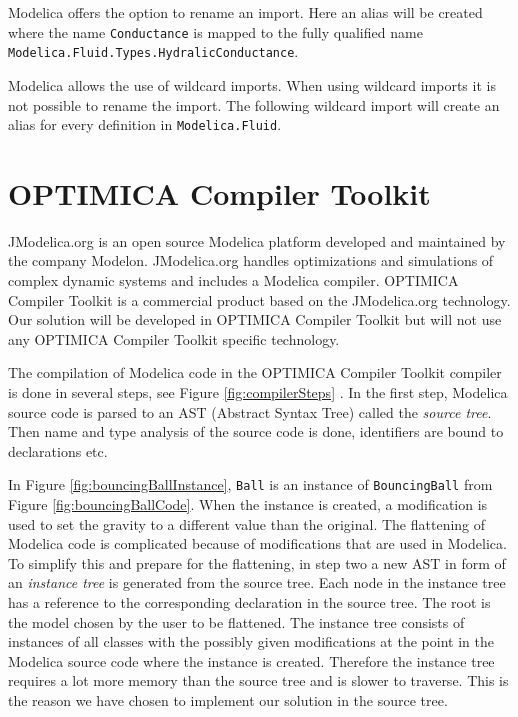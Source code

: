 \documentclass{cslthse-msc}
\begin{document}


Modelica offers the option to rename an import. Here an alias will be created where the name \texttt{Conductance} is mapped to the fully qualified name \\\texttt{Modelica.Fluid.Types.HydralicConductance}.



Modelica allows the use of wildcard imports. When using wildcard imports it is not possible to rename the import. The following wildcard import will create an alias for every definition in \texttt{Modelica.Fluid}.



\section{OPTIMICA Compiler Toolkit}
JModelica.org is an open source Modelica platform developed and maintained by the company Modelon. JModelica.org handles optimizations and simulations of complex dynamic systems and includes a Modelica compiler. OPTIMICA Compiler Toolkit  is a commercial product based on the JModelica.org technology. Our solution will be developed in OPTIMICA Compiler Toolkit  but will not use any OPTIMICA Compiler Toolkit  specific technology. 

The compilation of Modelica code in the OPTIMICA Compiler Toolkit  compiler is done in several steps, see Figure \ref{fig:compilerSteps} \cite{aakesson2010implementation}. In the first step, Modelica source code is parsed to an AST (Abstract Syntax Tree) called the \emph{source tree}. Then name and type analysis of the source code is done, identifiers are bound to declarations etc.

In Figure \ref{fig:bouncingBallInstance}, \texttt{Ball} is an instance of \texttt{BouncingBall} from Figure \ref{fig:bouncingBallCode}. When the instance is created, a modification is used to set the gravity to a different value than the original. The flattening of Modelica code is complicated because of modifications that are used in Modelica. To simplify this and  prepare for the flattening, in step two a new AST in form of an \emph{instance tree} is generated from the source tree. Each node in the instance tree has a reference to the corresponding declaration in the source tree. The root is the model chosen by the user to be flattened. The instance tree consists of instances of all classes with the possibly given modifications at the point in the Modelica source code where the instance is created. Therefore the instance tree requires a lot more memory than the source tree and is slower to traverse. This is the reason we have chosen to implement our solution in the source tree. 
\end{document}
